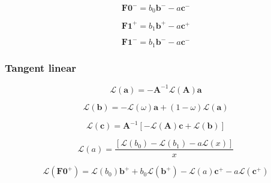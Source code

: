 \begin{equation}
\mathbf{F0}^{-} = b_{0} \mathbf{b}^{-} - a \mathbf{c}^{-}
\label{eq:thermal_source_local_thermal_source-forward-f0_m}
\end{equation}

\begin{equation}
\mathbf{F1}^{+} = b_{1} \mathbf{b}^{+} - a \mathbf{c}^{+}
\label{eq:thermal_source_local_thermal_source-forward-f1_p}
\end{equation}

\begin{equation}
\mathbf{F1}^{-} = b_{1} \mathbf{b}^{-} - a \mathbf{c}^{-}
\label{eq:thermal_source_local_thermal_source-forward-f1_m}
\end{equation}


%
\subsubsection{Tangent linear}
\label{sec:thermal_source_local_thermal_source-tangent_linear}

\begin{equation}
\mathcal{L}(\mathbf{a}) = -\mathbf{A}^{-1}\mathcal{L}(\mathbf{A})\mathbf{a}
\label{eq:thermal_source_local_thermal_source-tangent_linear-a_l}
\end{equation}

\begin{equation}
\mathcal{L}(\mathbf{b}) = -\mathcal{L}(\omega)\mathbf{a} + (1 - \omega) \mathcal{L}(\mathbf{a})
\label{eq:thermal_source_local_thermal_source-tangent_linear-b_l}
\end{equation}

\begin{equation}
\mathcal{L}(\mathbf{c}) = \mathbf{A}^{-1}\left[-\mathcal{L}(\mathbf{A})\mathbf{c} + \mathcal{L}(\mathbf{b})\right]
\label{eq:thermal_source_local_thermal_source-tangent_linear-c_l}
\end{equation}

\begin{equation}
\mathcal{L}(a) = \frac{\left[\mathcal{L}(b_{0}) - \mathcal{L}(b_{1}) - a \mathcal{L}(x)\right]}{x}
\label{eq:thermal_source_local_thermal_source-tangent_linear-a_l}
\end{equation}

\begin{equation}
\mathcal{L}(\mathbf{F0}^{+}) = \mathcal{L}(b_{0}) \mathbf{b}^{+} + b_{0} \mathcal{L}(\mathbf{b}^{+}) - \mathcal{L}(a) \mathbf{c}^{+} - a \mathcal{L}(\mathbf{c}^{+})
\label{eq:thermal_source_local_thermal_source-tangent_linear-f0_p_l}
\end{equation}

